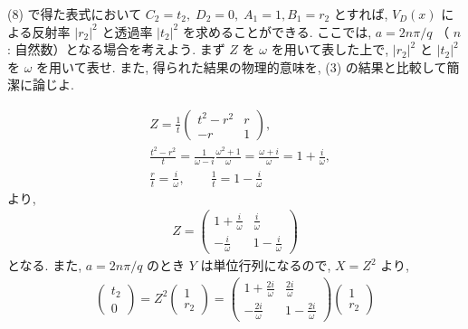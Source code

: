 \documentclass[../../ou-physics-exam.tex]{subfiles}
\begin{document}
(8) で得た表式において $ C_2 = t_2, \; D_2 = 0, \; A_1 = 1, B_1 = r_2 $ とすれば, $ V_D (x) $ による反射率 $ |r_2|^2 $ と透過率 $ |t_2|^2 $ を求めることができる. 
ここでは, $ a = 2n \pi / q $ （ $ n $ : 自然数）となる場合を考えよう. 
まず $ Z $ を $ \omega $ を用いて表した上で, $ |r_2|^2 $ と $ |t_2|^2 $ を $ \omega $ を用いて表せ. 
また, 得られた結果の物理的意味を, (3) の結果と比較して簡潔に論じよ.
\begin{answer}
    \begin{align*}
        & Z = \frac{1}{t} 
        \begin{pmatrix}
            t^2 - r^2 & r \\
            -r & 1
        \end{pmatrix}, \\
        & \frac{t^2 - r^2}{t} = \frac{1}{\omega - i} \frac{\omega^2 + 1}{\omega} = \frac{\omega + i}{\omega} = 1 + \frac{i}{\omega}, \\[2mm]
        & \frac{r}{t} = \frac{i}{\omega}, \qquad \frac{1}{t} = 1 - \frac{i}{\omega}
    \end{align*}
    より,
    \begin{align*}
        Z = 
        \begin{pmatrix}
            1 + \frac{i}{\omega} & \frac{i}{\omega} \\
            - \frac{i}{\omega} & 1 - \frac{i}{\omega}
        \end{pmatrix}
    \end{align*}
    となる. 
    また, $ a = 2n \pi / q $ のとき $ Y $ は単位行列になるので, $ X = Z^2 $ より,
    \begin{align*}
        \begin{pmatrix}
            t_2 \\ 0
        \end{pmatrix} = Z^2 
        \begin{pmatrix}
            1 \\ r_2
        \end{pmatrix} = 
        \begin{pmatrix}
            1 + \frac{2i}{\omega} & \frac{2i}{\omega} \\
            - \frac{2i}{\omega} & 1 - \frac{2i}{\omega}
        \end{pmatrix}
        \begin{pmatrix}
            1 \\ r_2
        \end{pmatrix}
    \end{align*}

\end{answer}
\end{document}
